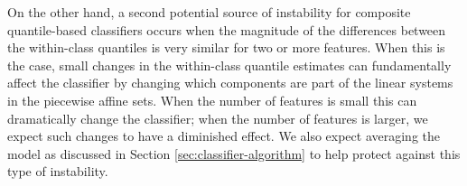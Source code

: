 On the other hand, a second potential source of instability for composite
quantile-based classifiers occurs when the magnitude of the differences between
the within-class quantiles is very similar for two or more features.  When this
is the case, small changes in the within-class quantile estimates can
fundamentally affect the classifier by changing which components are part of the
linear systems in the piecewise affine sets.  When the number of features is
small this can dramatically change the classifier; when the number of features
is larger, we expect such changes to have a diminished effect.  We also expect
averaging the model as discussed in Section \ref{sec:classifier-algorithm} to
help protect against this type of instability.


